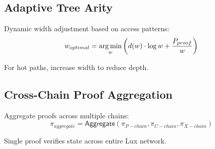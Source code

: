 \subsection{Adaptive Tree Arity}

Dynamic width adjustment based on access patterns:
\begin{equation}
    w_{optimal} = \operatorname*{arg\,min}_{w} \left( d(w) \cdot \log w + \frac{P_{proof}}{w} \right)
\end{equation}

For hot paths, increase width to reduce depth.

\subsection{Cross-Chain Proof Aggregation}

Aggregate proofs across multiple chains:
\begin{equation}
    \pi_{aggregate} = \mathsf{Aggregate}(\pi_{P-chain}, \pi_{C-chain}, \pi_{X-chain})
\end{equation}

Single proof verifies state across entire Lux network.

